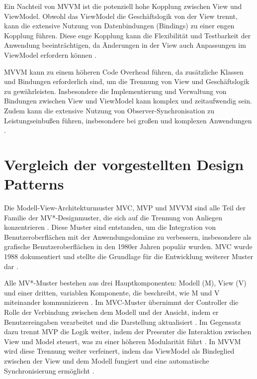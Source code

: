 Ein Nachteil von \ac{MVVM} ist die potenziell hohe Kopplung zwischen View und ViewModel. Obwohl das ViewModel die Geschäftslogik von der View trennt, kann die extensive Nutzung von Datenbindungen (Bindings) zu einer engen Kopplung führen. Diese enge Kopplung kann die Flexibilität und Testbarkeit der Anwendung beeinträchtigen, da Änderungen in der View auch Anpassungen im ViewModel erfordern können \cite{arcos2018comparative}.

\ac{MVVM} kann zu einem höheren Code Overhead führen, da zusätzliche Klassen und Bindungen erforderlich sind, um die Trennung von View und Geschäftslogik zu gewährleisten. Insbesondere die Implementierung und Verwaltung von Bindungen zwischen View und ViewModel kann komplex und zeitaufwendig sein. Zudem kann die extensive Nutzung von Observer-Synchronisation zu Leistungseinbußen führen, insbesondere bei großen und komplexen Anwendungen \cite{arcos2018comparative}.

\section{Vergleich der vorgestellten Design Patterns}
Die Modell-View-Architekturmuster MVC, MVP und MVVM sind alle Teil der Familie der 
MV*-Designmuster, die sich auf die Trennung von Anliegen konzentrieren \cite{aihara2012mvc}. Diese 
Muster sind entstanden, um die Integration von Benutzeroberflächen mit der Anwendungsdomäne zu 
verbessern, insbesondere als grafische Benutzeroberflächen in den 1980er Jahren populär wurden. 
MVC wurde 1988 dokumentiert und stellte die Grundlage für die Entwicklung weiterer Muster dar 
\cite{aihara2012mvc}.

Alle MV*-Muster bestehen aus drei Hauptkomponenten: Modell (M), View (V) und einer dritten, 
variablen Komponente, die beschreibt, wie M und V miteinander kommunizieren \cite{aihara2012mvc}. Im 
MVC-Muster übernimmt der Controller die Rolle der Verbindung zwischen dem Modell und der 
Ansicht, indem er Benutzereingaben verarbeitet und die Darstellung aktualisiert 
\cite{aihara2012mvc}. Im Gegensatz dazu trennt MVP die Logik weiter, indem der Presenter die 
Interaktion zwischen View und Model steuert, was zu einer höheren Modularität führt 
\cite{aihara2012mvc}. In MVVM wird diese Trennung weiter verfeinert, indem das ViewModel als 
Bindeglied zwischen der View und dem Modell fungiert und eine automatische Synchronisierung 
ermöglicht \cite{aihara2012mvc}.